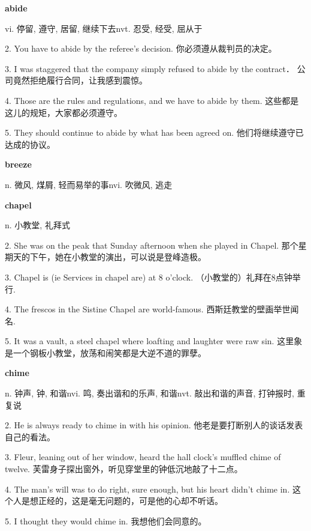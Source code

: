 \documentclass[12pt]{book}
\begin{document}
\textbf{abide}

vi. 停留, 遵守, 居留, 继续下去nvt. 忍受, 经受, 屈从于

2.  You have to abide by the referee's decision.  你必须遵从裁判员的决定。 


3.  I was staggered that the company simply refused to abide by the contract．  公司竟然拒绝履行合同，让我感到震惊。 


4.  Those are the rules and regulations, and we have to abide by them.  这些都是这儿的规矩，大家都必须遵守。 


5.  They should continue to abide by what has been agreed on.  他们将继续遵守已达成的协议。 


\vspace{12pt}

\textbf{breeze}

n. 微风, 煤屑, 轻而易举的事nvi. 吹微风, 逃走

\vspace{12pt}

\textbf{chapel}

n. 小教堂, 礼拜式

2.  She was on the peak that Sunday afternoon when she played in Chapel.  那个星期天的下午，她在小教堂的演出，可以说是登峰造极。 


3.  Chapel is (ie Services in chapel are) at 8 o'clock.  （小教堂的）礼拜在8点钟举行. 


4.  The frescos in the Sistine Chapel are world-famous.  西斯廷教堂的壁画举世闻名. 


5.  It was a vault, a steel chapel where loafting and laughter were raw sin.  这里象是一个钢板小教堂，放荡和闹笑都是大逆不道的罪孽。 


\vspace{12pt}

\textbf{chime}

n. 钟声, 钟, 和谐nvi. 鸣, 奏出谐和的乐声, 和谐nvt. 敲出和谐的声音, 打钟报时, 重复说

2.  He is always ready to chime in with his opinion.  他老是要打断别人的谈话发表自己的看法。 


3.  Fleur, leaning out of her window, heard the hall clock's muffled chime of twelve.  芙雷身子探出窗外，听见穿堂里的钟低沉地敲了十二点。 


4.  The man's will was to do right, sure enough, but his heart didn't chime in.  这个人是想正经的，这是毫无问题的，可是他的心却不听话。 


5.  I thought they would chime in.  我想他们会同意的。 
\end{document}
